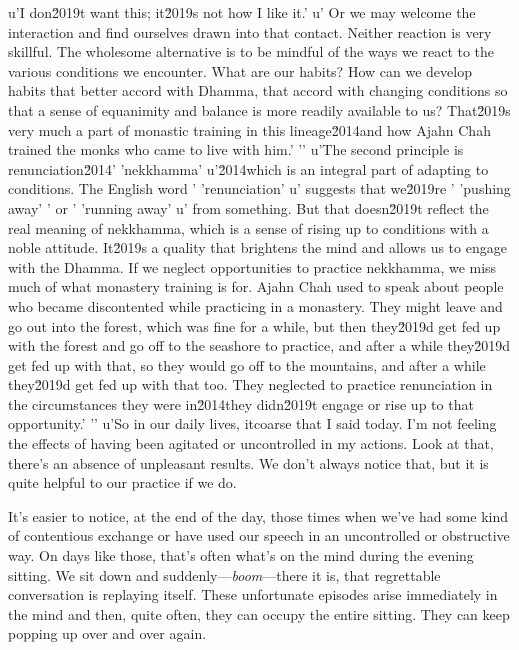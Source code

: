 {u'I don\u2019t want this; it\u2019s not how I like it.'
u' Or we may welcome the interaction and find ourselves drawn into that contact. Neither reaction is very skillful. The wholesome alternative is to be mindful of the ways we react to the various conditions we encounter. What are our habits? How can we develop habits that better accord with Dhamma, that accord with changing conditions so that a sense of equanimity and balance is more readily available to us? That\u2019s very much a part of monastic training in this lineage\u2014and how Ajahn Chah trained the monks who came to live with him.'
'\n'
u'The second principle is renunciation\u2014'
'nekkhamma'
u'\u2014which is an integral part of adapting to conditions. The English word '
'renunciation'
u' suggests that we\u2019re '
'pushing away'
' or '
'running away'
u' from something. But that doesn\u2019t reflect the real meaning of nekkhamma, which is a sense of rising up to conditions with a noble attitude. It\u2019s a quality that brightens the mind and allows us to engage with the Dhamma. If we neglect opportunities to practice nekkhamma, we miss much of what monastery training is for. Ajahn Chah used to speak about people who became discontented while practicing in a monastery. They might leave and go out into the forest, which was fine for a while, but then they\u2019d get fed up with the forest and go off to the seashore to practice, and after a while they\u2019d get fed up with that, so they would go off to the mountains, and after a while they\u2019d get fed up with that too. They neglected to practice renunciation in the circumstances they were in\u2014they didn\u2019t engage or rise up to that opportunity.'
'\n'
u'So in our daily lives, it\or coarse that I said today. I'm not feeling the effects of 
having been agitated or uncontrolled in my actions. Look at that, 
there's an absence of unpleasant results}. We don't always notice that, 
but it is quite helpful to our practice if we do.

It's easier to notice, at the end of the day, those times when we've 
had some kind of contentious exchange or have used our speech in an 
uncontrolled or obstructive way. On days like those, that's often 
what's on the mind during the evening sitting. We sit down and 
suddenly---\emph{boom}---there it is, that regrettable conversation is 
replaying itself. These unfortunate episodes arise immediately in the 
mind and then, quite often, they can occupy the entire sitting. They 
can keep popping up over and over again.

